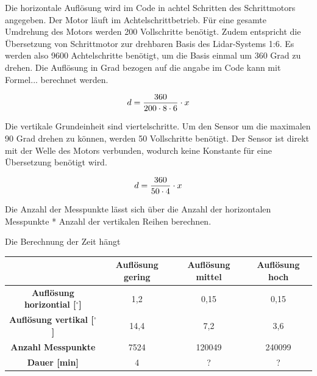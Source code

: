 Die horizontale Auflösung wird im Code in achtel Schritten des Schrittmotors angegeben. Der Motor läuft im Achtelschrittbetrieb. Für eine gesamte Umdrehung des Motors werden 200 Vollschritte benötigt. Zudem entspricht die Übersetzung von Schrittmotor zur drehbaren Basis des Lidar-Systems 1:6. Es werden also 9600 Achtelschritte benötigt, um die Basis einmal um 360 Grad zu drehen. Die Auflösung in Grad bezogen auf die angabe im Code kann mit Formel... berechnet werden. 

\begin{equation}\formelentry{Berechnung horizontiale Auflösung}
d = \frac{360}{200 \cdot 8 \cdot 6} \cdot x
\end{equation}

Die vertikale Grundeinheit sind viertelschritte. Um den Sensor um die maximalen 90 Grad drehen zu können, werden 50 Vollschritte benötigt. Der Sensor ist direkt mit der Welle des Motors verbunden, wodurch keine Konstante für eine Übersetzung benötigt wird.

\begin{equation}\formelentry{Berechnung vertikale Auflösung}
d = \frac{360}{50 \cdot 4} \cdot x
\end{equation}


Die Anzahl der Messpunkte lässt sich über die Anzahl der horizontalen Messpunkte * Anzahl der vertikalen Reihen berechnen.



Die Berechnung der Zeit hängt 

\begin{center}
	\begin{tabular} [H] {|c|c|c|c|}
		\hline
		\textbf{}										 &\textbf{Auflösung gering} & \textbf{Auflösung mittel}	& \textbf{Auflösung hoch} \\ \hline
		\textbf{Auflösung horizontial [$^{\circ} $]}	 & 1,2 	& 0,15 	 & 0,15			\\ \hline
		\textbf{Auflösung vertikal [$ ^{\circ} $]}		 & 14,4 & 7,2 	 & 3,6  		\\ \hline
		\textbf{Anzahl Messpunkte}						 & 7524 & 120049 & 240099 		\\ \hline
		\textbf{Dauer [min]}							  	 & 4    & ?	 & ? 		 	\\ \hline
		
		\end {tabular}
		\label{uebersicht}
	\end{center}


